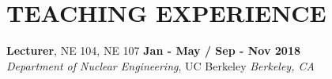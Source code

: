 \section{\small{TEACHING EXPERIENCE}}

\textbf{Lecturer}, NE 104, NE 107 \hfill \textbf{Jan - May / Sep - Nov 2018} \\
\textsl{Department of Nuclear Engineering}, UC Berkeley \hfill \textsl{Berkeley, CA}\\[-2.8ex]


